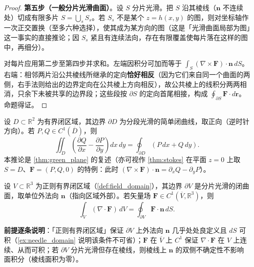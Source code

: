 \begin{proof}
\textbf{第五步（一般分片光滑曲面）}。设 $S$ 分片光滑。把 $S$ 沿其棱线（$\mathbf n$ 不连续处）切成有限多片 $S=\bigcup_sS_s$。若 $S_s$ 不是某个 $z=h(x,y)$ 的图，则对坐标轴作一次正交置换（至多六种选择），使其成为某方向的图（这是「光滑曲面局部为图」这一事实的直接推论；因 $S_s$ 紧且有连续法向，存在有限覆盖使每片落在这样的图中，再细分）。

对每片应用第二步至第四步并求和。左端因积分可加而等于 $\int_S(\nabla\times\mathbf F)\cdot\mathbf n\,dS$。右端：相邻两片沿公共棱线所继承的定向\textbf{恰好相反}（因为它们来自同一个曲面的两侧，右手法则给出的边界定向在公共棱上方向相反），故公共棱上的线积分两两相消，只余下未被共享的边界段；这些段按 $\partial S$ 的定向首尾相接，构成 $\oint_{\partial S}\mathbf F\cdot d\mathbf r$。命题得证。
\end{proof}

\begin{corollary}[格林公式]\label{cor:green}
设 $D \subset \mathbb{R}^2$ 为有界闭区域，其边界 $\partial D$ 为分段光滑的简单闭曲线，取正向（逆时针方向）。若 $P, Q \in C^1(\overline{D})$，则
\[
\iint_D \left( \frac{\partial Q}{\partial x} - \frac{\partial P}{\partial y} \right) dx\, dy = \oint_{\partial D} (P \, dx + Q \, dy).
\]
本推论是 \cref{thm:green_plane} 的复述（亦可视作 \cref{thm:stokes} 在平面 $z=0$ 上取 $S=D$、$\mathbf F=(P,Q,0)$ 的特例：此时 $(\nabla\times\mathbf F)\cdot\mathbf n=\partial_xQ-\partial_yP$）。
\end{corollary}

\begin{theorem}\label{thm:divergence}
设 $V \subset \mathbb{R}^3$ 为正则有界闭区域（\cref{def:field_domain}），其边界 $\partial V$ 是分片光滑的闭曲面，取单位外法向 $\mathbf{n}$（指向区域外部）。若矢量场 $\mathbf{F} \in C^1(\overline{V}, \mathbb{R}^3)$，则
\[
\int_V (\nabla \cdot \mathbf{F}) \, dV = \oint_{\partial V} \mathbf{F} \cdot \mathbf{n} \, dS.
\]

\textbf{前提逐条说明}：「正则有界闭区域」保证 $\partial V$ 上外法向 $\mathbf n$ 几乎处处良定义且 $dS$ 可积（\cref{ex:needle_domain} 说明该条件不可省）；$\mathbf F$ 在 $\overline V$ 上 $C^1$ 保证 $\nabla\cdot\mathbf F$ 在 $V$ 上连续、从而可积；若 $\partial V$ 分片光滑但存在棱线，则棱线上 $\mathbf n$ 的双侧不确定性不影响面积分（棱线面积为零）。
\end{theorem}

